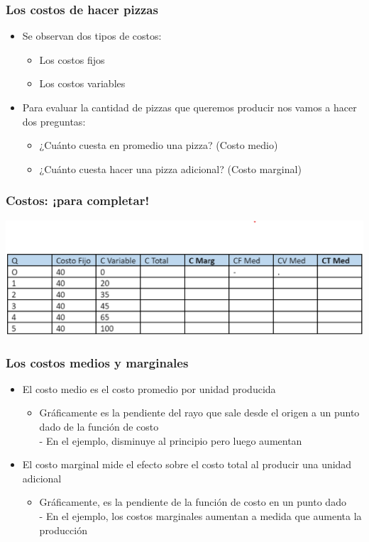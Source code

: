 \documentclass{beamer}
\begin{document}
\begin{frame}
\frametitle{Los costos de hacer pizzas}
\begin{itemize}
    \item Se observan dos tipos de costos: 
        \begin{itemize}
        \item Los costos fijos
        \item Los costos variables
        \end{itemize}
    \vspace{2mm}
    \item Para evaluar la cantidad de pizzas que queremos producir nos vamos a hacer dos preguntas:
        \begin{itemize}
        \item ¿Cuánto cuesta en promedio una pizza? (Costo medio)
        \item ¿Cuánto cuesta hacer una pizza adicional? (Costo marginal)
        \end{itemize}
\end{itemize}
\end{frame}

\begin{frame}
\frametitle{Costos: ¡para completar! }
\centering
\includegraphics[scale=0.45]{../Figures/Tabla_Costos_Completar.png}
\end{frame}

\begin{frame}
\frametitle{Los costos medios y marginales}
\begin{itemize}
    \item El costo medio es el costo promedio por unidad producida
    \begin{itemize}
        \item Gráficamente es la pendiente del rayo que sale desde el origen a un punto dado de la función de costo \\
        - En el ejemplo, disminuye al principio pero luego aumentan 
    \end{itemize}
    \item El costo marginal mide el efecto sobre el costo total al producir una unidad adicional
    \begin{itemize}
        \item Gráficamente, es la pendiente de la función de costo en un punto dado \\
        - En el ejemplo, los costos marginales aumentan a medida que aumenta la producción
    \end{itemize}
\end{itemize}
\end{frame}
\end{document}
